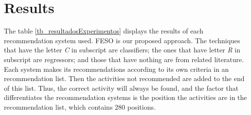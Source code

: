 \documentclass[10pt,letterpaper]{article}
\begin{document}
\section*{Results}
The table \ref{tb_resultadosExperimentos} displays the results of each recommendation system used. FESO is our proposed approach. The techniques that have the letter \emph{C} in subscript are classifiers; the ones that have letter \emph{R} in subscript are regressors; and those that have nothing are from related literature. Each system makes its recommendations according to its own criteria in an recommendation list. Then the activities not recommended are added to the end of this list. Thus, the correct activity will always be found, and the factor that differentiates the recommendation systems is the position the activities are in the recommendation list, which contains \(280\) positions.
\bgroup
\end{document}
